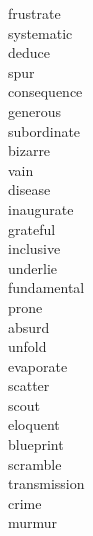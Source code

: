 \documentclass[a4paper, 10pt]{ctexart}
\begin{document}
\begin{multicols*}{2}
\begin{description}
\item[frustrate]

\item[systematic]

\item[deduce]

\item[spur]

\item[consequence]

\item[generous]

\item[subordinate]

\item[bizarre]

\item[vain]

\item[disease]

\item[inaugurate]

\item[grateful]

\item[inclusive]

\item[underlie]

\item[fundamental]

\item[prone]

\item[absurd]

\item[unfold]

\item[evaporate]

\item[scatter]

\item[scout]

\item[eloquent]

\item[blueprint]

\item[scramble]

\item[transmission]

\item[crime]

\item[murmur]


\end{description}
\end{multicols*}
\end{document}
